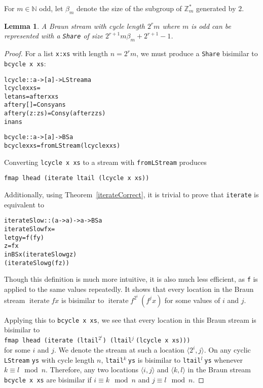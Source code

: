 \documentclass{llncs}
\DeclareMathOperator{\iter}{iterate}
\newtheorem{lemma}[theorem]{Lemma}
\begin{document}
For $m \in \mathbb{N}$ odd, let $\beta_m$ denote the size of the subgroup of $\mathbb{Z}_m^*$ generated by $2$.
\begin{lemma}
\label{cycleSize}
A Braun stream with cycle length $2^r m$ where $m$ is odd can be represented with a {\tt Share} of size $2^{r+1} m \beta_m + 2^{r+1} - 1$.
\end{lemma}
\begin{proof}
For a list {\tt x:xs} with length $n = 2^r m$, we must produce a {\tt Share} bisimilar to {\tt bcycle x xs}:

\begin{alltt}
lcycle :: a -> [a] -> LStream a
lcycle x xs = 
  let ans = after x xs
      after y [] = Cons y ans
      after y (z:zs) = Cons y (after z zs)
  in ans

bcycle :: a -> [a] -> BS a
bcycle x xs = fromLStream (lcycle x xs)
\end{alltt}

Converting {\tt lcycle x xs} to a stream with {\tt fromLStream} produces 

{\tt fmap lhead (iterate ltail (lcycle x xs))}

Additionally, using Theorem~\ref{iterateCorrect}, it is trivial to prove that {\tt iterate} is equivalent to

\begin{alltt}
iterateSlow :: (a -> a) -> a -> BS a
iterateSlow f x =
  let g y = f (f y)
      z = f x
  in BS x (iterateSlow g    z) 
          (iterateSlow g (f z))
\end{alltt}

Though this definition is much more intuitive, it is also much less efficient, as {\tt f} is applied to the same values repeatedly.
It shows that every location in the Braun stream $\iter f x$ is bisimilar to $\iter f^{2^i}\ (f^j x)$ for some values of $i$ and $j$.

Applying this to {\tt bcycle x xs}, we see that every location in this Braun stream is bisimilar to 
\\
{\tt fmap lhead (iterate (ltail}$^{2^i}${\tt ) (ltail}$^j\ ${\tt (lcycle x xs)))} 
\\
for some $i$ and $j$.
We denote the stream at such a location $\langle 2^i,j \rangle$.
On any cyclic {\tt LStream} {\tt ys} with cycle length $n$, {\tt ltail}$^k\ ${\tt ys} is bisimilar to {\tt ltail}$^l\ ${\tt ys} whenever $k \equiv l \mod n$.
Therefore, any two locations $\langle i,j \rangle$ and $\langle k,l \rangle$ in the Braun stream {\tt bcycle x xs} are bisimilar if $i \equiv k \mod n$ and $j \equiv l \mod n$.


\end{proof}
\end{document}
